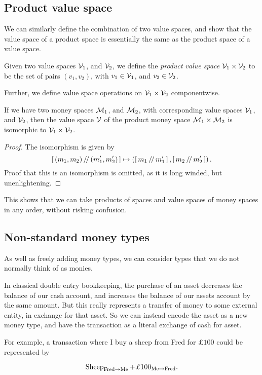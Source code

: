 \subsection{Product value space}

We can similarly define the combination of two value spaces,
and show that the value space of a product space is essentially the same as the product space of a value space.

\begin{definition}
    Given two value spaces $\mathcal{V}_1$, and $\mathcal{V}_2$, we define the \emph{product value space} $\mathcal{V}_1 \times \mathcal{V}_2$ to be the set of pairs $(v_1, v_2)$,
    with $v_1 \in \mathcal{V}_1$, and $v_2 \in \mathcal{V}_2$.

    Further, we define value space operations on $\mathcal{V}_1 \times \mathcal{V}_2$ componentwise.
\end{definition}

\begin{theorem}
    If we have two money spaces $\mathcal{M}_1$, and $\mathcal{M}_2$, with corresponding value spaces $\mathcal{V}_1$, and $\mathcal{V}_2$,
    then the value space $\mathcal{V}$ of the product money space $\mathcal{M}_1 \times \mathcal{M}_2$
    is isomorphic to $\mathcal{V}_1 \times \mathcal{V}_2$.
\end{theorem}

\begin{proof}
    The isomorphism is given by
    \begin{equation*}
        \left[\,(m_1, m_2)\,/\!/\,(m'_1, m'_2)\,\right] \mapsto \left(\left[\,m_1\,/\!/\,m'_1\,\right], \left[\,m_2\,/\!/\,m'_2\,\right]\right).
    \end{equation*}
    Proof that this is an isomorphism is omitted, as it is long winded, but unenlightening.
\end{proof}

This shows that we can take products of spaces and value spaces of money spaces in any order, without risking confusion.

\subsection{Non-standard money types}

As well as freely adding money types, we can consider types that we do not normally think of as monies.

In classical double entry bookkeeping, the purchase of an asset decreases the balance of our cash account, and increases the balance of our assets account by the same amount.
But this really represents a transfer of money to some external entity, in exchange for that asset.
So we can instead encode the asset as a new money type, and have the transaction as a literal exchange of cash for asset.

\begin{example}
    For example, a transaction where I buy a sheep from Fred for $\pounds 100$ could be represented by

    \begin{equation*}
        \sheep_{\fred \to \me} + \pounds 100_{\me \to \fred}.
    \end{equation*}
\end{example}
